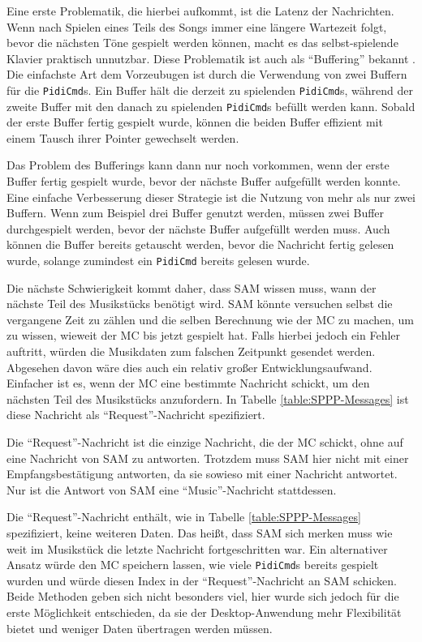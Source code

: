 Eine erste Problematik, die hierbei aufkommt, ist die Latenz der Nachrichten.
Wenn nach Spielen eines Teils des Songs immer eine längere Wartezeit folgt, bevor die nächsten Töne gespielt werden können, macht es das selbst-spielende Klavier praktisch unnutzbar.
Diese Problematik ist auch als \enquote{Buffering} bekannt \cite[vgl.][]{clo.WhatDoesBuffering.21}. \newline
Die einfachste Art dem Vorzeubugen ist durch die Verwendung von zwei Buffern für die \lstinline|PidiCmd|s.
Ein Buffer hält die derzeit zu spielenden \lstinline|PidiCmd|s, während der zweite Buffer mit den danach zu spielenden \lstinline|PidiCmd|s befüllt werden kann.
Sobald der erste Buffer fertig gespielt wurde, können die beiden Buffer effizient mit einem Tausch ihrer Pointer gewechselt werden.

Das Problem des Bufferings kann dann nur noch vorkommen, wenn der erste Buffer fertig gespielt wurde, bevor der nächste Buffer aufgefüllt werden konnte.
Eine einfache Verbesserung dieser Strategie ist die Nutzung von mehr als nur zwei Buffern.
Wenn zum Beispiel drei Buffer genutzt werden, müssen zwei Buffer durchgespielt werden, bevor der nächste Buffer aufgefüllt werden muss.
Auch können die Buffer bereits getauscht werden, bevor die Nachricht fertig gelesen wurde, solange zumindest ein \lstinline|PidiCmd| bereits gelesen wurde.

Die nächste Schwierigkeit kommt daher, dass \ac{SAM} wissen muss, wann der nächste Teil des Musikstücks benötigt wird. \newline
\ac{SAM} könnte versuchen selbst die vergangene Zeit zu zählen und die selben Berechnung wie der \ac{MC} zu machen, um zu wissen, wieweit der \ac{MC} bis jetzt gespielt hat.
Falls hierbei jedoch ein Fehler auftritt, würden die Musikdaten zum falschen Zeitpunkt gesendet werden.
Abgesehen davon wäre dies auch ein relativ großer Entwicklungsaufwand.
Einfacher ist es, wenn der \ac{MC} eine bestimmte Nachricht schickt, um den nächsten Teil des Musikstücks anzufordern.
In Tabelle \ref{table:SPPP-Messages} ist diese Nachricht als \enquote{Request}-Nachricht spezifiziert.

Die \enquote{Request}-Nachricht ist die einzige Nachricht, die der \ac{MC} schickt, ohne auf eine Nachricht von \ac{SAM} zu antworten.
Trotzdem muss \ac{SAM} hier nicht mit einer Empfangsbestätigung antworten, da sie sowieso mit einer Nachricht antwortet.
Nur ist die Antwort von \ac{SAM} eine \enquote{Music}-Nachricht stattdessen.

Die \enquote{Request}-Nachricht enthält, wie in Tabelle \ref{table:SPPP-Messages} spezifiziert, keine weiteren Daten.
Das heißt, dass \ac{SAM} sich merken muss wie weit im Musikstück die letzte Nachricht fortgeschritten war.
Ein alternativer Ansatz würde den \ac{MC} speichern lassen, wie viele \lstinline{PidiCmd}s bereits gespielt wurden und würde diesen Index in der \enquote{Request}-Nachricht an \ac{SAM} schicken.
Beide Methoden geben sich nicht besonders viel, hier wurde sich jedoch für die erste Möglichkeit entschieden, da sie der Desktop-Anwendung mehr Flexibilität bietet und weniger Daten übertragen werden müssen.

